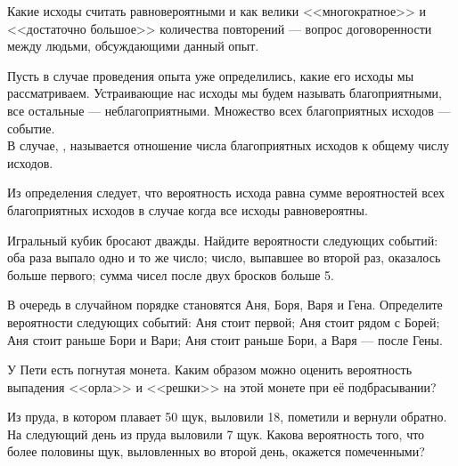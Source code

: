 \documentclass[a4paper,12pt]{article}
\begin{document}
Какие исходы считать равновероятными и как велики <<многократное>> и <<достаточно большое>> количества повторений --- вопрос договоренности между людьми, обсуждающими данный опыт. %

  Пусть в случае проведения опыта уже определились, какие его исходы мы рассматриваем. Устраивающие нас исходы мы будем называть  благоприятными, все остальные ---  неблагоприятными. Множество всех благоприятных исходов ---  событие.\\
  В случае, ,  называется отношение числа благоприятных исходов к общему числу исходов.

    Из определения следует, что вероятность исхода равна сумме вероятностей всех благоприятных исходов в случае когда все исходы равновероятны.

  Игральный кубик бросают дважды. Найдите вероятности следующих событий:  оба раза выпало одно и то же число;  число, выпавшее во второй раз, оказалось больше первого;  сумма чисел после двух бросков больше 5.

  В очередь в случайном порядке становятся Аня, Боря, Варя и Гена. Определите вероятности следующих событий:  Аня стоит первой;  Аня стоит рядом с Борей;  Аня стоит раньше Бори и Вари;  Аня стоит раньше Бори, а Варя --- после Гены.

  У Пети есть погнутая монета. Каким образом можно оценить вероятность выпадения <<орла>> и <<решки>> на этой монете при её подбрасывании?


  Из пруда, в котором плавает 50 щук, выловили 18, пометили и вернули обратно. На следующий день из пруда выловили 7 щук. Какова вероятность того, что более половины щук, выловленных во второй день, окажется помеченными?
\end{document}
